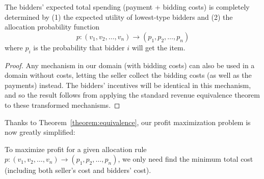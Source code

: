 \begin{theorem}\label{theorem:equivalence}
The bidders' expected total spending (payment + bidding costs)
is completely determined by (1) the expected utility of
lowest-type bidders and (2) the allocation probability function
$$p: (v_1, v_2, \ldots, v_n) \rightarrow (p_1, p_2, \ldots, p_n)$$ 
where $p_i$ is the probability that bidder $i$ will get the item.
\end{theorem}
\begin{proof}
  Any mechanism in our domain (with bidding costs) can also be used in a
  domain without costs, letting the seller collect the bidding costs (as
  well as the payments) instead.  The bidders' incentives will be identical
  in this mechanism, and so the result follows from applying the
  standard revenue equivalence theorem to these transformed mechanisms.
\end{proof}


Thanks to Theorem~\ref{theorem:equivalence}, our profit maximization problem
is now greatly simplified: 

\begin{corollary}
To maximize profit for a given allocation rule $p: (v_1, v_2, \ldots, v_n)
\rightarrow (p_1, p_2, \ldots, p_n)$, we only need find the minimum total cost
(including both seller's cost and bidders' cost).
\end{corollary}

